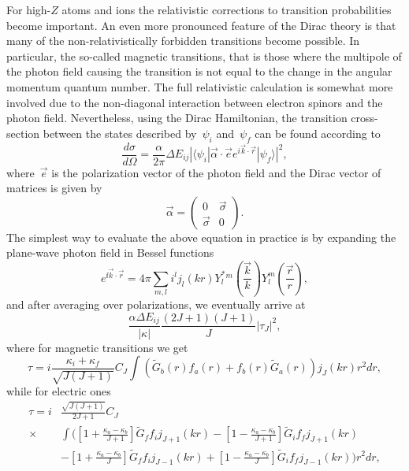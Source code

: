 For high-$Z$ atoms and ions the relativistic corrections to transition probabilities become important. An even more pronounced feature of the Dirac theory is that many of the non-relativistically forbidden transitions become possible. In particular, the so-called magnetic transitions, that is those where the multipole of the photon field causing the transition is not equal to the change in the angular momentum quantum number. The full relativistic calculation is somewhat more involved due to the non-diagonal interaction between electron spinors and the photon field. Nevertheless, using the Dirac Hamiltonian, the transition cross-section between the states described by~$\psi_i$ and~$\psi_f$ can be found according to~\cite{mikhailov1969relativistic}
\begin{equation}
   \frac{d\sigma}{d\Omega} = \frac{\alpha}{2\pi}\Delta E_{ij}|\langle\psi_i|\vec{\alpha} \cdot \vec{e}e^{i \vec{k} \cdot \vec{r}}|\psi_f\rangle|^2,
\end{equation}
where~$\vec{e}$ is the polarization vector of the photon field and the Dirac vector of matrices is given by~\cite{lifshitz1974relativistic}
\begin{equation}
    \vec{\alpha}=\left(\begin{matrix}0&\vec{\sigma}\\\vec{\sigma}&0\end{matrix}\right).
\end{equation}
The simplest way to evaluate the above equation in practice is by expanding the plane-wave photon field in Bessel functions~\cite{AS}
\begin{equation}
    e^{\ii \vec{k} \cdot \vec{r}} = 4\pi \sum_{m,l} i^l j_l \left(k r \right)Y^*_l^m\left(\frac{\vec{k}}{k}\right)Y_l^m\left(\frac{\vec{r}}{r}\right),
\end{equation}
and after averaging over polarizations, we eventually arrive at
\begin{equation}
    \frac{\alpha \Delta E_{ij}}{|\kappa|} \frac{(2J+1)(J+1)}{J} |\tau_J|^2,
\end{equation}
where for magnetic transitions we get
\begin{equation}
    \tau = i \frac{\kappa_i+\kappa_f}{\sqrt{J(J+1)}} C_J \int (\widetilde{G}_b(r)f_a(r)+f_b(r)\widetilde{G}_a(r))j_J(kr) r^2 dr,
\end{equation}
while for electric ones
\begin{align}
    \tau =i &\frac{\sqrt{J(J+1)}}{2J+1} C_J \nonumber
    \\
    \times& \int\Bigg(\left[1+\frac{\kappa_a-\kappa_b}{J+1}\right]\widetilde{G}_f f_i j_{J+1}(k r) - \left[1-\frac{\kappa_a-\kappa_b}{J+1}\right]\widetilde{G}_i f_f j_{J+1}(k r) \nonumber
    \\
    &-\left[1+\frac{\kappa_a-\kappa_b}{J}\right]\widetilde{G}_f f_i j_{J-1}(k r)+\left[1-\frac{\kappa_a-\kappa_b}{J}\right]\widetilde{G}_i f_f j_{J-1}(k r)\Bigg)r^2 dr,
\end{align}
